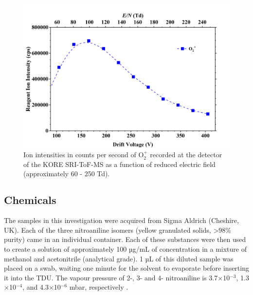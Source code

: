 \begin{figure}%
\centering
\includegraphics[height=0.35\textheight]{pics/nitros_paper_2.png}
\caption{Ion intensities in counts per second of O$_2^+$ recorded at the detector of the KORE SRI-ToF-MS as a function of reduced electric field (approximately 60 - 250 Td).}
\label{fig:na_fig2}
\end{figure}

\subsection{Chemicals}
The samples in this investigation were acquired from Sigma Aldrich (Cheshire, UK). Each of the three nitroaniline isomers (yellow granulated solids, >98\% purity) came in an individual container. 
Each of these substances were then used to create a solution of approximately 100 µg/mL of concentration in a mixture of methanol and acetonitrile (analytical grade).
1 µL of this diluted sample was placed on a swab, waiting one minute for the solvent to evaporate before inserting it into the TDU.
The vapour pressure of 2-, 3- and 4- nitroaniline is 3.7$\times$10$^{-3}$, 1.3$\times$10$^{-4}$, and 4.3$\times$10$^{-6}$ mbar, respectively \cite{2na,3na,4na}.




